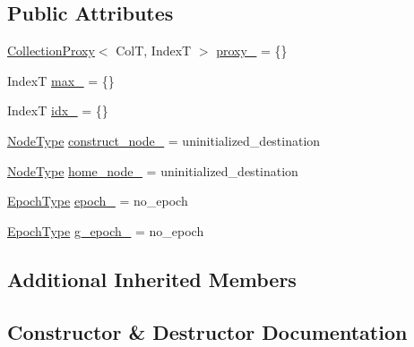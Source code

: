 \subsection*{Public Attributes}
\begin{DoxyCompactItemize}
\item 
\hyperlink{structvt_1_1vrt_1_1collection_1_1_collection_proxy}{Collection\+Proxy}$<$ ColT, IndexT $>$ \hyperlink{structvt_1_1vrt_1_1collection_1_1_insert_msg_a7f679b8e031239c31fe8061e9a18f568}{proxy\+\_\+} = \{\}
\item 
IndexT \hyperlink{structvt_1_1vrt_1_1collection_1_1_insert_msg_a8e6cba1aa922c74d219db407343530b1}{max\+\_\+} = \{\}
\item 
IndexT \hyperlink{structvt_1_1vrt_1_1collection_1_1_insert_msg_a34ee4c02fcf0ae389eb0f11a44033ccc}{idx\+\_\+} = \{\}
\item 
\hyperlink{namespacevt_a866da9d0efc19c0a1ce79e9e492f47e2}{Node\+Type} \hyperlink{structvt_1_1vrt_1_1collection_1_1_insert_msg_a58fd21706a7cf67fc92d19facb9b260a}{construct\+\_\+node\+\_\+} = uninitialized\+\_\+destination
\item 
\hyperlink{namespacevt_a866da9d0efc19c0a1ce79e9e492f47e2}{Node\+Type} \hyperlink{structvt_1_1vrt_1_1collection_1_1_insert_msg_a0ab2ebbf58c63307eb4b7e0794cd60d8}{home\+\_\+node\+\_\+} = uninitialized\+\_\+destination
\item 
\hyperlink{namespacevt_a985a5adf291c34a3ca263b3378388236}{Epoch\+Type} \hyperlink{structvt_1_1vrt_1_1collection_1_1_insert_msg_adb7966a80d37bddff7a1d1e3eaba880e}{epoch\+\_\+} = no\+\_\+epoch
\item 
\hyperlink{namespacevt_a985a5adf291c34a3ca263b3378388236}{Epoch\+Type} \hyperlink{structvt_1_1vrt_1_1collection_1_1_insert_msg_a7d080a6dc4e89607097f79e751dbbd70}{g\+\_\+epoch\+\_\+} = no\+\_\+epoch
\end{DoxyCompactItemize}
\subsection*{Additional Inherited Members}


\subsection{Constructor \& Destructor Documentation}
\mbox{\label{structvt_1_1vrt_1_1collection_1_1_insert_msg_a44aed2e193e9972e28eb9c757cfe4e0b}} 
